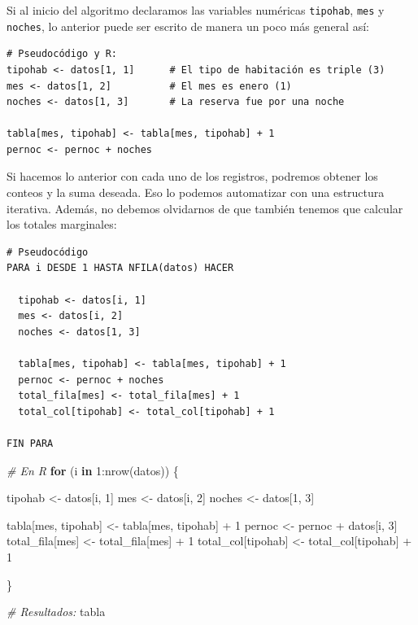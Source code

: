 \documentclass[
]{book}
\newenvironment{Shaded}{\begin{snugshade}}{\end{snugshade}}
\newcommand{\CommentTok}[1]{\textcolor[rgb]{0.56,0.35,0.01}{\textit{#1}}}
\newcommand{\ControlFlowTok}[1]{\textcolor[rgb]{0.13,0.29,0.53}{\textbf{#1}}}
\newcommand{\DecValTok}[1]{\textcolor[rgb]{0.00,0.00,0.81}{#1}}
\newcommand{\FunctionTok}[1]{\textcolor[rgb]{0.00,0.00,0.00}{#1}}
\newcommand{\NormalTok}[1]{#1}
\newcommand{\OtherTok}[1]{\textcolor[rgb]{0.56,0.35,0.01}{#1}}
\newcommand{\SpecialCharTok}[1]{\textcolor[rgb]{0.00,0.00,0.00}{#1}}
\begin{document}
Si al inicio del algoritmo declaramos las variables numéricas \texttt{tipohab}, \texttt{mes} y \texttt{noches}, lo anterior puede ser escrito de manera un poco más general así:

\begin{verbatim}
# Pseudocódigo y R:
tipohab <- datos[1, 1]      # El tipo de habitación es triple (3)
mes <- datos[1, 2]          # El mes es enero (1)
noches <- datos[1, 3]       # La reserva fue por una noche

tabla[mes, tipohab] <- tabla[mes, tipohab] + 1
pernoc <- pernoc + noches
\end{verbatim}

Si hacemos lo anterior con cada uno de los registros, podremos obtener los conteos y la suma deseada. Eso lo podemos automatizar con una estructura iterativa. Además, no debemos olvidarnos de que también tenemos que calcular los totales marginales:

\begin{verbatim}
# Pseudocódigo
PARA i DESDE 1 HASTA NFILA(datos) HACER
  
  tipohab <- datos[i, 1]
  mes <- datos[i, 2]
  noches <- datos[1, 3]
  
  tabla[mes, tipohab] <- tabla[mes, tipohab] + 1
  pernoc <- pernoc + noches
  total_fila[mes] <- total_fila[mes] + 1
  total_col[tipohab] <- total_col[tipohab] + 1
  
FIN PARA
\end{verbatim}

\begin{Shaded}
\begin{Highlighting}[]
\CommentTok{\# En R}
\ControlFlowTok{for}\NormalTok{ (i }\ControlFlowTok{in} \DecValTok{1}\SpecialCharTok{:}\FunctionTok{nrow}\NormalTok{(datos)) \{}
    
\NormalTok{    tipohab }\OtherTok{\textless{}{-}}\NormalTok{ datos[i, }\DecValTok{1}\NormalTok{]}
\NormalTok{    mes }\OtherTok{\textless{}{-}}\NormalTok{ datos[i, }\DecValTok{2}\NormalTok{]}
\NormalTok{    noches }\OtherTok{\textless{}{-}}\NormalTok{ datos[}\DecValTok{1}\NormalTok{, }\DecValTok{3}\NormalTok{]}
    
\NormalTok{    tabla[mes, tipohab] }\OtherTok{\textless{}{-}}\NormalTok{ tabla[mes, tipohab] }\SpecialCharTok{+} \DecValTok{1}
\NormalTok{    pernoc }\OtherTok{\textless{}{-}}\NormalTok{ pernoc }\SpecialCharTok{+}\NormalTok{ datos[i, }\DecValTok{3}\NormalTok{]}
\NormalTok{    total\_fila[mes] }\OtherTok{\textless{}{-}}\NormalTok{ total\_fila[mes] }\SpecialCharTok{+} \DecValTok{1}
\NormalTok{    total\_col[tipohab] }\OtherTok{\textless{}{-}}\NormalTok{ total\_col[tipohab] }\SpecialCharTok{+} \DecValTok{1}
    
\NormalTok{\}}

\CommentTok{\# Resultados: }
\NormalTok{tabla}
\end{Highlighting}
\end{Shaded}
\end{document}
